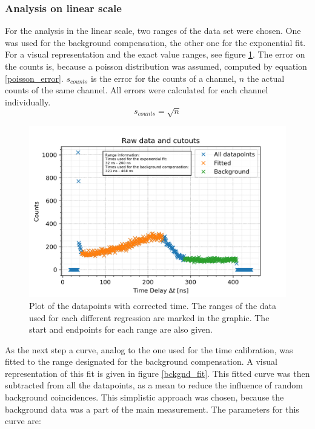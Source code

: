 \documentclass[30pt,a4paper]{article}
\begin{document}
 	\subsubsection{Analysis on linear scale}
 	For the analysis in the linear scale, two ranges of the data set were chosen.
 	One	was used for the background compensation, the other one for the exponential fit.
 	For a visual representation and the exact value ranges, see figure \ref{raw_plot}.
 	The error on the counts is, because a poisson distribution was assumed, computed by
 	equation \ref{poisson_error}. $s_{counts}$ is the error for the counts of a channel, $n$  the actual counts of the same channel. All errors were calculated for each channel individually.
 	\begin{equation}
 	s_{counts}=\sqrt{n}
 	\label{poisson_error}
 	\end{equation}
 	
 	
	\begin{figure}[h]
 		\includegraphics{Bilder/raw_ranges}
 		\centering
 		\caption{\small Plot of the datapoints with corrected time. The ranges of the data used for each different regression are marked in the graphic. The start and endpoints for each range are also given.}
 		\label{raw_plot}
 	\end{figure}
 	
	As the next step a curve, analog to the one used for the time calibration, was
	fitted to the range designated for the background compensation. A visual
	representation of this fit is given in figure \ref{bckgnd_fit}. This fitted curve
	was then subtracted from all the datapoints, as a mean to reduce the influence of
	random background coincidences. This simplistic approach was chosen, because the 
	background data was a part of the main measurement. The parameters for this curve
	are:
	
\end{document}
